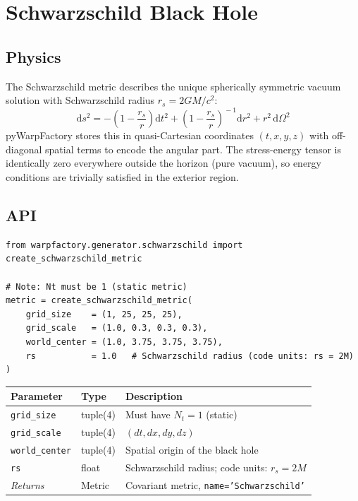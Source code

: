 \documentclass[11pt, a4paper, twoside]{report}
\newcommand{\dd}{\mathrm{d}}
\begin{document}
\section{Schwarzschild Black Hole}
\label{sec:schwarzschild}

\subsection{Physics}

The Schwarzschild metric describes the unique spherically symmetric
vacuum solution with Schwarzschild radius $r_s = 2GM/c^2$:
\begin{equation}
  \dd s^2
  = -\!\left(1 - \frac{r_s}{r}\right)\dd t^2
  + \left(1 - \frac{r_s}{r}\right)^{\!-1}\!\dd r^2
  + r^2\,\dd\Omega^2
  \label{eq:schw_spherical}
\end{equation}
pyWarpFactory stores this in quasi-Cartesian coordinates $(t,x,y,z)$
with off-diagonal spatial terms to encode the angular part.  The
stress-energy tensor is identically zero everywhere outside the horizon
(pure vacuum), so energy conditions are trivially satisfied in the
exterior region.

\subsection{API}

\begin{lstlisting}[caption={Schwarzschild metric}]
from warpfactory.generator.schwarzschild import create_schwarzschild_metric

# Note: Nt must be 1 (static metric)
metric = create_schwarzschild_metric(
    grid_size    = (1, 25, 25, 25),
    grid_scale   = (1.0, 0.3, 0.3, 0.3),
    world_center = (1.0, 3.75, 3.75, 3.75),
    rs           = 1.0   # Schwarzschild radius (code units: rs = 2M)
)
\end{lstlisting}

\begin{center}
\begin{tabularx}{\linewidth}{llX}
  \toprule
  Parameter & Type & Description \\
  \midrule
  \texttt{grid\_size}    & tuple(4) & Must have $N_t = 1$ (static) \\
  \texttt{grid\_scale}   & tuple(4) & $(dt, dx, dy, dz)$ \\
  \texttt{world\_center} & tuple(4) & Spatial origin of the black hole \\
  \texttt{rs}            & float    & Schwarzschild radius; code units: $r_s = 2M$ \\
  \midrule
  \emph{Returns}         & Metric   & Covariant metric, \texttt{name='Schwarzschild'} \\
  \bottomrule
\end{tabularx}
\end{center}
\end{document}
